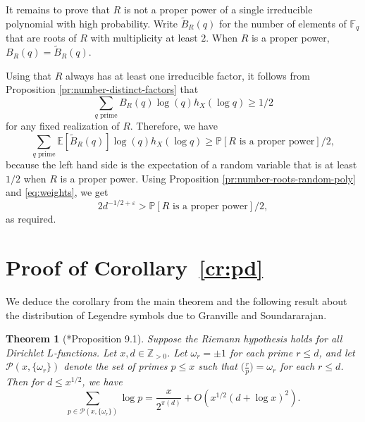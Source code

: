 \documentclass[12pt, notitlepage]{amsart}
\numberwithin{equation}{section}
\def\Z{\mathbb Z}
\def\P{\mathbb P}
\def\F{\mathbb F}
\def\E{\mathbb E}
\def\wt{\widetilde}
\newcommand{\cP}{\mathcal{P}}
\newtheorem{theorem}{Theorem}[section]
\theoremstyle{remark}
\theoremstyle{definition}
\theoremstyle{remark}
\numberwithin{equation}{section}
\newcommand{\e}{\varepsilon}
\begin{document}
It remains to prove that $R$ is not a proper power of a single irreducible polynomial
with high probability.
Write $\wt B_R(q)$ for the number of elements of $\F_q$ that are roots of
$R$ with multiplicity at least $2$.
When $R$ is a proper power, $B_R(q)=\wt B_R(q)$.

Using that $R$ always has at least one irreducible factor, it follows
from Proposition \ref{pr:number-distinct-factors} that
\[
\sum_{\text{$q$ prime}} B_R(q)\log(q)h_X(\log q) \ge 1/2
\]
for any fixed realization of $R$.
Therefore, we have 
\[
\sum_{\text{$q$ prime}} \E[\wt B_R(q)]\log(q)h_X(\log q)
\ge\P[\text{$R$ is a proper power}]/2,
\]
because the left hand side is the expectation of a random variable that is at least $1/2$ when $R$
is a proper power.
Using Proposition \ref{pr:number-roots-random-poly} and \eqref{eq:weights},
we get
\[
2 d^{-1/2+\e}>\P[\text{$R$ is a proper power}]/2,
\]
as required.

 
\section{Proof of Corollary~\ref{cr:pd}}
\label{sc:proof-cor}

We deduce the corollary from the main theorem and the following result
about the distribution of Legendre symbols due to Granville and Soundararajan.

\begin{theorem}[\cite{GS}*{Proposition 9.1}]\label{th:GS}
Suppose the Riemann hypothesis holds for all Dirichlet $L$-functions.
Let $x,d\in\Z_{>0}$.
Let $\omega_r=\pm1$ for each prime $r\le d$, and let
$\cP(x,\{\omega_r\})$ denote the set of primes $p\le x$ such that
$\big(\frac{r}{p}\big)=\omega_r$ for each $r\le d$.
Then for $d\le x^{1/2}$, we have
\[
\sum_{p\in\cP(x,\{\omega_r\})}\log p = \frac{x}{2^{\pi(d)}}+O(x^{1/2}(d+\log x)^2).
\]
\end{theorem}
\end{document}
